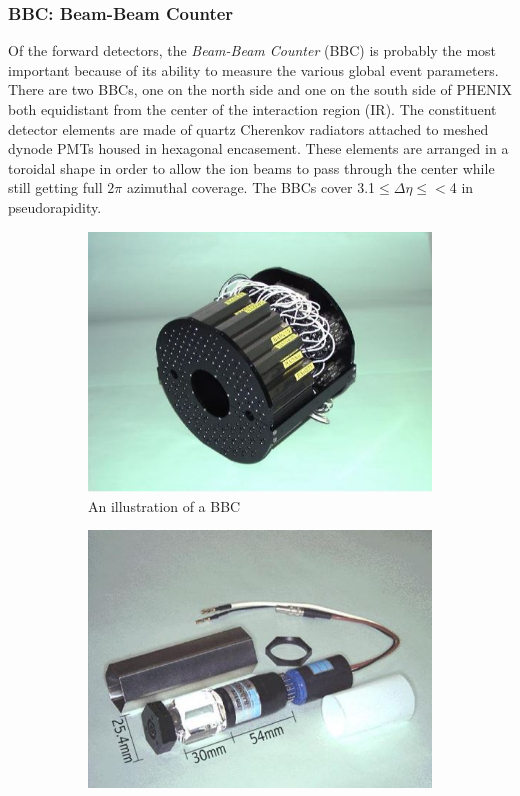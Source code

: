 \subsubsection{BBC: Beam-Beam Counter}
Of the forward detectors, the \textit{Beam-Beam Counter} (BBC) is probably the most important because of its ability to measure the various global event parameters. There are two BBCs, one on the north side and one on the south side of PHENIX both equidistant from the center of the interaction region (IR). The constituent detector elements are made of quartz Cherenkov radiators attached to meshed dynode PMTs housed in hexagonal encasement. These elements are arranged in a toroidal shape in order to allow the ion beams to pass through the center while still getting full $2\pi$ azimuthal coverage. The BBCs cover 3.1$\leq \Delta \eta \leq<$4 in pseudorapidity.
\begin{figure}
\centering
\begin{subfigure}[b]{0.4\textwidth}
    \centering
    \includegraphics[width=\textwidth]{Figures/bbcrender.JPG}
    \caption{An illustration of a BBC}
    \label{fig:ppiratiocentvsperiph}
\end{subfigure}
\begin{subfigure}[b]{0.4\textwidth}
    \centering
    \includegraphics[width=\textwidth]{Figures/bbcsinglechannel.JPG}

\end{subfigure}
\end{figure}
